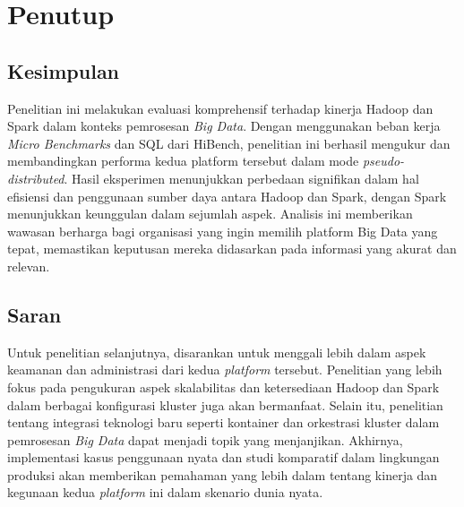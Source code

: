 \chapter{Penutup}

\section{Kesimpulan}
Penelitian ini melakukan evaluasi komprehensif terhadap kinerja Hadoop dan Spark dalam konteks pemrosesan \textit{Big Data}. Dengan menggunakan beban kerja \textit{Micro Benchmarks} dan SQL dari HiBench, penelitian ini berhasil mengukur dan membandingkan performa kedua platform tersebut dalam mode \textit{pseudo-distributed}. Hasil eksperimen menunjukkan perbedaan signifikan dalam hal efisiensi dan penggunaan sumber daya antara Hadoop dan Spark, dengan Spark menunjukkan keunggulan dalam sejumlah aspek. Analisis ini memberikan wawasan berharga bagi organisasi yang ingin memilih platform Big Data yang tepat, memastikan keputusan mereka didasarkan pada informasi yang akurat dan relevan.

\section{Saran}
Untuk penelitian selanjutnya, disarankan untuk menggali lebih dalam aspek keamanan dan administrasi dari kedua \textit{platform} tersebut. Penelitian yang lebih fokus pada pengukuran aspek skalabilitas dan ketersediaan Hadoop dan Spark dalam berbagai konfigurasi kluster juga akan bermanfaat. Selain itu, penelitian tentang integrasi teknologi baru seperti kontainer dan orkestrasi kluster dalam pemrosesan \textit{Big Data} dapat menjadi topik yang menjanjikan. Akhirnya, implementasi kasus penggunaan nyata dan studi komparatif dalam lingkungan produksi akan memberikan pemahaman yang lebih dalam tentang kinerja dan kegunaan kedua \textit{platform} ini dalam skenario dunia nyata.
